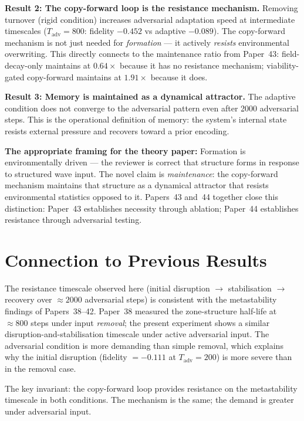 \documentclass[11pt]{article}
\begin{document}
\textbf{Result 2: The copy-forward loop is the resistance mechanism.}
Removing turnover (rigid condition) increases adversarial adaptation speed at
intermediate timescales ($T_\mathrm{adv}=800$: fidelity $-0.452$ vs adaptive $-0.089$).
The copy-forward mechanism is not just needed for \emph{formation} --- it actively
\emph{resists} environmental overwriting.
This directly connects to the maintenance ratio from Paper~43:
field-decay-only maintains at $0.64\times$ because it has no resistance mechanism;
viability-gated copy-forward maintains at $1.91\times$ because it does.

\textbf{Result 3: Memory is maintained as a dynamical attractor.}
The adaptive condition does not converge to the adversarial pattern even after 2000
adversarial steps.
This is the operational definition of memory: the system's internal state resists
external pressure and recovers toward a prior encoding.

\textbf{The appropriate framing for the theory paper:}
Formation is environmentally driven --- the reviewer is correct that structure forms
in response to structured wave input.
The novel claim is \emph{maintenance}: the copy-forward mechanism maintains that
structure as a dynamical attractor that resists environmental statistics opposed to it.
Papers~43 and~44 together close this distinction: Paper~43 establishes necessity
through ablation; Paper~44 establishes resistance through adversarial testing.

\section{Connection to Previous Results}

The resistance timescale observed here (initial disruption $\to$ stabilisation $\to$
recovery over $\approx 2000$ adversarial steps) is consistent with the metastability
findings of Papers~38--42.
Paper~38 measured the zone-structure half-life at $\approx 800$ steps under input
\emph{removal}; the present experiment shows a similar disruption-and-stabilisation
timescale under active adversarial input.
The adversarial condition is more demanding than simple removal, which explains why
the initial disruption (fidelity $= -0.111$ at $T_\mathrm{adv}=200$) is more severe
than in the removal case.

The key invariant: the copy-forward loop provides resistance on the metastability
timescale in both conditions.
The mechanism is the same; the demand is greater under adversarial input.
\end{document}
